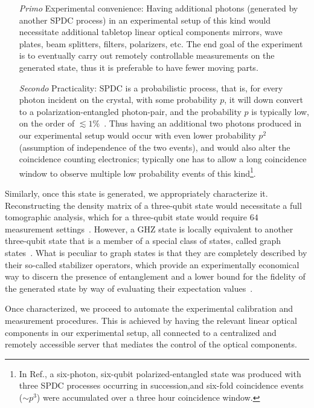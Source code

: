 \begin{itemize}
	\item[\emph{Primo}] Experimental convenience: Having additional photons (generated by another \acs{SPDC} process) in an experimental setup of this kind would necessitate additional tabletop linear optical components \ie mirrors, wave plates, beam splitters, filters, polarizers, etc. The end goal of the experiment is to eventually carry out remotely controllable measurements on the generated state, thus it is preferable to have fewer moving parts. 

	\item[\emph{Secondo}] Practicality: \acs{SPDC} is a probabilistic process, that is, for every photon incident on the crystal, with some probability $p$, it will down convert to a polarization-entangled photon-pair, and the probability $p$ is typically low, on the order of $\lesssim 1\%$~\cite{Kok_2007}. Thus having an additional two photons produced in our experimental setup would occur with even lower probability $p^2$ (assumption of independence of the two events), and would also alter the coincidence counting electronics; typically one has to allow a long coincidence window to observe multiple low probability events of this kind\footnote{In Ref.\cite{Lu_2006}, a six-photon, six-qubit polarized-entangled state was produced with three \acs{SPDC} processes occurring in succession,and six-fold coincidence events (${\sim p^3}$) were accumulated over a three hour coincidence window.}.
\end{itemize}

\noindent
Similarly, once this state is generated, we appropriately characterize it. Reconstructing the density matrix of a three-qubit state would necessitate a full tomographic analysis, which for a three-qubit state would require $64$ measurement settings~\cite{Resch_2005}. However, a \acs{GHZ} state is locally equivalent to another three-qubit state that is a member of a special class of states, called graph states~\cite{Hein_2004,Raussendorf_2003}. What is peculiar to graph states is that they are completely described by their so-called stabilizer operators, which provide an experimentally economical way to discern the presence of entanglement and a lower bound for the fidelity of the generated state by way of evaluating their expectation values~\cite{Toth_2005}.

\bigskip
\noindent
Once characterized, we proceed to automate the experimental calibration and measurement procedures. This is achieved by having the relevant linear optical components in our experimental setup, all connected to a centralized and remotely accessible server that mediates the control of the optical components. 

